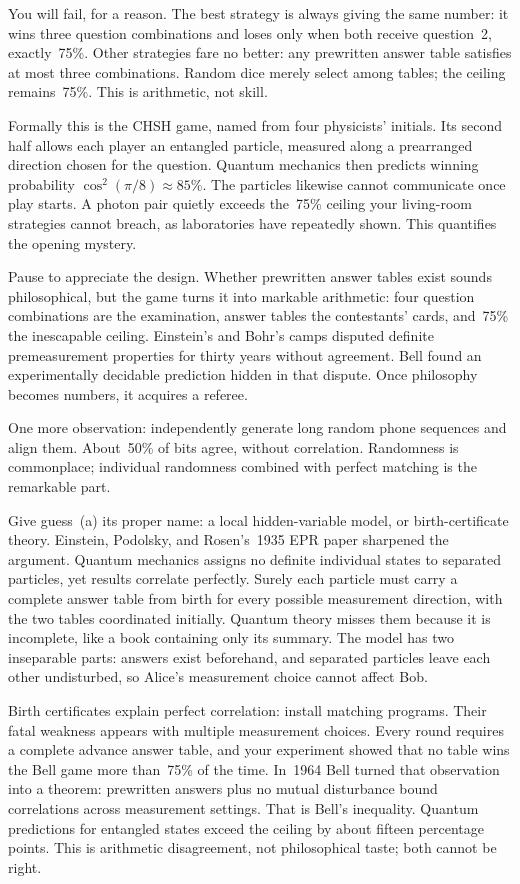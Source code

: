 You will fail, for a reason. The best strategy is always giving the same number: it wins three question combinations and loses only when both receive question~2, exactly~75\%. Other strategies fare no better: any prewritten answer table satisfies at most three combinations. Random dice merely select among tables; the ceiling remains~75\%. This is arithmetic, not skill.

Formally this is the CHSH game, named from four physicists' initials. Its second half allows each player an entangled particle, measured along a prearranged direction chosen for the question. Quantum mechanics then predicts winning probability \(\cos^2(\pi/8)\approx85\%\). The particles likewise cannot communicate once play starts. A photon pair quietly exceeds the~75\% ceiling your living-room strategies cannot breach, as laboratories have repeatedly shown. This quantifies the opening mystery.

Pause to appreciate the design. Whether prewritten answer tables exist sounds philosophical, but the game turns it into markable arithmetic: four question combinations are the examination, answer tables the contestants' cards, and~75\% the inescapable ceiling. Einstein's and Bohr's camps disputed definite premeasurement properties for thirty years without agreement. Bell found an experimentally decidable prediction hidden in that dispute. Once philosophy becomes numbers, it acquires a referee.

One more observation: independently generate long random phone sequences and align them. About~50\% of bits agree, without correlation. Randomness is commonplace; individual randomness combined with perfect matching is the remarkable part.


Give guess~(a) its proper name: a local hidden-variable model, or birth-certificate theory. Einstein, Podolsky, and Rosen's~1935 EPR paper sharpened the argument. Quantum mechanics assigns no definite individual states to separated particles, yet results correlate perfectly. Surely each particle must carry a complete answer table from birth for every possible measurement direction, with the two tables coordinated initially. Quantum theory misses them because it is incomplete, like a book containing only its summary. The model has two inseparable parts: answers exist beforehand, and separated particles leave each other undisturbed, so Alice's measurement choice cannot affect Bob.

Birth certificates explain perfect correlation: install matching programs. Their fatal weakness appears with multiple measurement choices. Every round requires a complete advance answer table, and your experiment showed that no table wins the Bell game more than~75\% of the time. In~1964 Bell turned that observation into a theorem: prewritten answers plus no mutual disturbance bound correlations across measurement settings. That is Bell's inequality. Quantum predictions for entangled states exceed the ceiling by about fifteen percentage points. This is arithmetic disagreement, not philosophical taste; both cannot be right.

